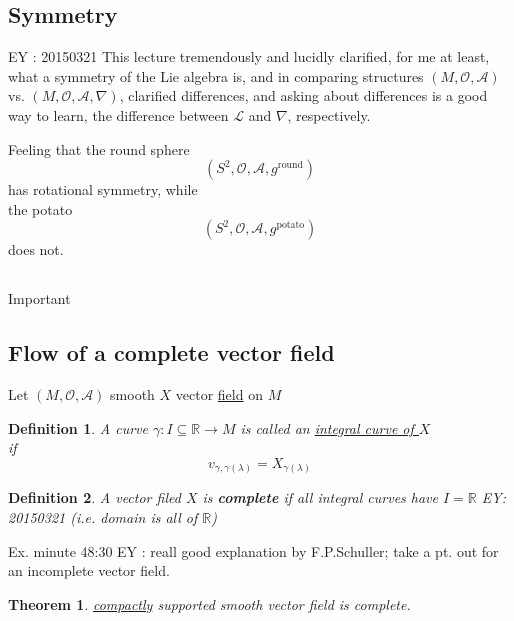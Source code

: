 \documentclass[10pt, twoside]{amsart}
\newtheorem{theorem}{Theorem}
\newtheorem{definition}{Definition}
\begin{document}
\begin{multicols*}{2}
\section{Symmetry}

EY : 20150321 This lecture tremendously and lucidly clarified, for me at least, what a symmetry of the Lie algebra is, and in comparing structures $(M,\mathcal{O}, \mathcal{A})$ vs. $(M,\mathcal{O}, \mathcal{A}, \nabla)$, clarified differences, and asking about differences is a good way to learn, the difference between $\mathcal{L}$ and $\nabla$, respectively.  

Feeling that the round sphere
\[
(S^2, \mathcal{O}, \mathcal{A},g^{\text{round}})
\]
has rotational symmetry, while \\
the potato
\[
(S^2, \mathcal{O},\mathcal{A}, g^{\text{potato}})
\]
does not.  

\subsection{}

\subsection{}

Important

\subsection{Flow of a complete vector field}

Let $(M,\mathcal{O},\mathcal{A})$ smooth $X$ vector \underline{field} on $M$

\begin{definition}
  A curve $\gamma :I \subseteq \mathbb{R} \to M$ is called an \underline{integral curve of $X$} \\
if 
\[
v_{\gamma,\gamma(\lambda)} = X_{\gamma(\lambda)}
\]
\end{definition}

\begin{definition} A vector filed $X$ is \textbf{complete} if all integral curves have $I = \mathbb{R}$ EY: 20150321 (i.e. domain is all of $\mathbb{R}$)
\end{definition}

Ex. minute 48:30 EY : reall good explanation by F.P.Schuller; take a pt. out for an incomplete vector field.

\begin{theorem}
  \underline{compactly} supported smooth vector field is complete.  
\end{theorem}


\end{multicols*}
\end{document}

